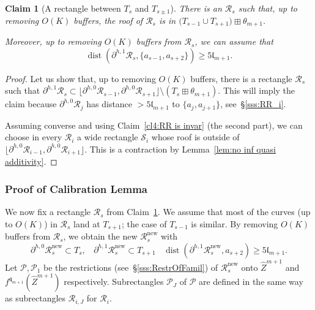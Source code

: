 \documentclass{amsart}
\renewcommand{\sp}{{\ \ }}
\newcommand{\1}{{\mathbb 1 }}
\newcommand\RR{\mathcal{R}}
\renewcommand\SS{\mathcal{S}}
\newcommand{\wZ}{{\widehat Z}}
\newcommand{\qq}{\mathfrak{q}}
\newcommand{\length}{{\mathfrak l}}
\newcommand\PP{\mathcal{P}}
\newcommand\new{{\operatorname{new}}}
\newtheorem{claim4}{Claim}
\theoremstyle{remark}
\numberwithin{equation}{section}
\theoremstyle{definition}
\newcommand{\dist}{\operatorname{dist}}
\begin{document}
\begin{claim4}[A rectangle between $T_{s}$ and $T_{s\pm1}$]
\label{cl4:RR_j}
There is an $\RR_s$ such that, up to removing $O(K)$ buffers, the roof of $\RR_s$ is in $\big(T_{s-1}\cup T_{s+1}\big)\boxplus \theta_{m+1}$. 

Moreover, up to removing $O(K)$ buffers from $\RR_s$, we can assume that \[\dist(\partial^{h,1} \RR_s, \{a_{s-1},a_{s+2}\})\ge 5\length_{m+1}.\]
\end{claim4}
\begin{proof}
Let us show that, up to removing $O(K)$ buffers, there is a rectangle $\RR_s$ such that $\partial^{h,1} \RR_s\subset \lfloor \partial ^{h,0} \RR_{s-1},\partial ^{h,0}\RR_{s+1} \rfloor\setminus (T_s\boxplus \theta_{m+1})$. This will imply the claim because $\partial^{h,0} \RR_j$ has distance $>5\length_{m+1}$ to $\{a_{j}, a_{j+1}\}$, see~\S\ref{sss:RR_i}.


 Assuming converse and using Claim~\ref{cl4:RR is invar} (the second part), we can choose in every $\RR_i$ a wide rectangle $\SS_i$ whose roof is outside of $\lfloor \partial ^{h,0} \RR_{i-1},\partial ^{h,0}\RR_{i+1} \rfloor$. This is a contraction by Lemma~\ref{lem:no inf quasi additivity}.
\end{proof}

\subsubsection{Proof of Calibration Lemma} We now fix a rectangle $\RR_s$ from Claim~\ref{cl4:RR_j}. We assume that most of the curves (up to $O(K)$) in $\RR_s$ land at $T_{s+1}$; the case of $T_{s-1}$ is similar. By removing $O( K)$ buffers from $\RR_s$, we obtain the new $\RR^\new_s$ with
\begin{equation} 
\label{eq:CL:prf:RR_s}
 \partial^{h,0}\RR_s^\new\subset T_s,\sp\sp  \partial^{h,1}\RR_s^\new\subset T_{s+1}\sp\sp \dist(\partial ^{h,1}\RR^\new_s , a_{s+2})\ge 5 \length_{m+1}.
\end{equation}
Let $\PP,\PP_1$ be the restrictions (see~\S\ref{sss:RestrOfFamil}) of $\RR^\new_s$ onto $\wZ^{m+1}$ and $f^{\qq_{m+1}}(\wZ^{m+1})$  respectively. Subrectangles $\PP_J$ of $\PP$ are defined in the same way as subrectangles $\RR_{i,J}$ for $\RR_i$. 
\end{document}

